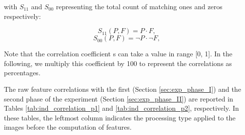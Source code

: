 with $S_{11}$ and $S_00$ representing the total count of matching ones and zeros respectively:

\begin{equation}
    S_{11}(P, F) = P \cdot F,
\end{equation}
\begin{equation}
    S_{00}(P, F) = \neg P \cdot \neg F, 
\end{equation}


Note that the correlation coefficient s can take a value in range [0, 1]. In the following, we multiply this coefficient by 100 to represent the correlations as percentages.

The raw feature correlations with the first (Section \ref{sec:exp_phase_I}) and the second phase of the experiment (Section \ref{sec:exp_phase_II}) are reported in Tables \ref{tab:ind_correlation_p1} and \ref{tab:ind_correlation_p2}, respectively. In these tables, the leftmost column indicates the processing type applied to the images before the computation of features.

